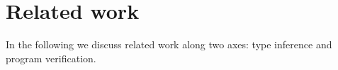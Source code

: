 \documentclass[preprint]{sig-alternate}
\newcommand{\codeid}[1]{\ifmmode{\mbox{\ttfamily{#1}}}\else{\ttfamily #1}\fi}
\newcommand{\todo}[1]{\relax}
\begin{document}
\section{Related work}
\label{sec:related-work}

In the following we discuss related work along two axes: type
inference and program verification.

\todo{This section is way too detailed.}


% 
% 
% 
% 
\end{document}
